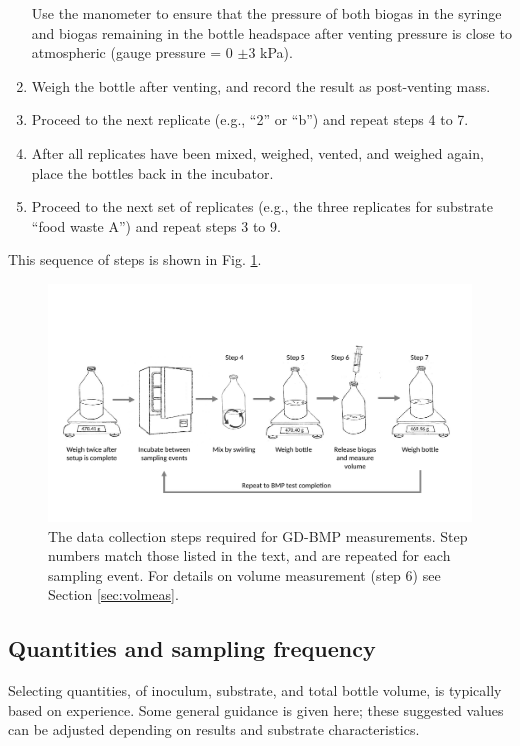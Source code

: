 \documentclass[]{article}
\begin{document}
\begin{enumerate}
      Use the manometer to ensure that the pressure of both biogas in the syringe and biogas remaining in the bottle headspace after venting pressure is close to atmospheric (gauge pressure = 0 $\pm3 $ kPa).
    \item Weigh the bottle after venting, and record the result as post-venting mass. 
    \item Proceed to the next replicate (e.g., ``2'' or ``b'') and repeat steps 4 to 7.
    \item After all replicates have been mixed, weighed, vented, and weighed again, place the bottles back in the incubator.
    \item Proceed to the next set of replicates (e.g., the three replicates for substrate ``food waste A'') and repeat steps 3 to 9.
\end{enumerate}

This sequence of steps is shown in Fig. \ref{fig:steps}.

\begin{figure}[ht]
  \includegraphics[width=\textwidth]{figs/GD_steps.pdf}
  \caption{The data collection steps required for GD-BMP measurements. Step numbers match those listed in the text, and are repeated for each sampling event. For details on volume measurement (step 6) see Section \ref{sec:volmeas}.}
  \label{fig:steps}
\end{figure}

\subsection{Quantities and sampling frequency}
\label{sec:freq}
Selecting quantities, of inoculum, substrate, and total bottle volume, is typically based on experience.
Some general guidance is given here; these suggested values can be adjusted depending on results and substrate characteristics.
\end{document}
